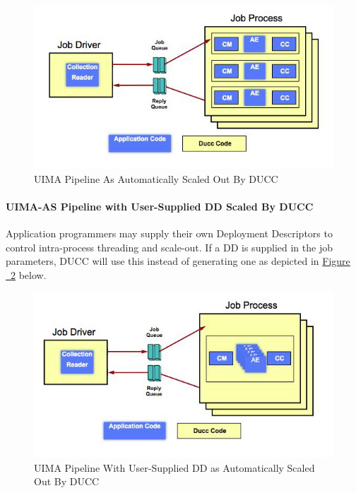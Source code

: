     \begin{figure}[H]
      \centering
      \includegraphics[bb=0 0 571 311, width=5.5in]{images/ducc-sequential.jpg}
      \caption{UIMA Pipeline As Automatically Scaled Out By DUCC\label{fig:UIMA-AS-pipeline-DUCC}}
    \end{figure}

    \paragraph{UIMA-AS Pipeline with User-Supplied DD Scaled By DUCC}

    Application programmers may supply their own Deployment Descriptors to control intra-process
    threading and scale-out.  If a DD is supplied in the job parameters, DUCC will use this instead
    of generating one as depicted in \hyperref[fig:UIMA-AS-pipeline-DUCC-DD]{Figure ~\ref{fig:UIMA-AS-pipeline-DUCC-DD}} below.

    \begin{figure}[H]
      \centering
      \includegraphics[bb=0 0 571 316,width=5.5in]{images/ducc-parallel.jpg}
      \caption{UIMA Pipeline With User-Supplied DD as Automatically Scaled Out By DUCC}
      \label{fig:UIMA-AS-pipeline-DUCC-DD}
    \end{figure}

